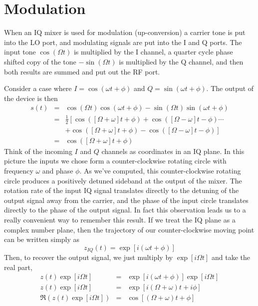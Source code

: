 \section{Modulation}

When an IQ mixer is used for modulation (up-conversion) a carrier tone is put into the LO port, and modulating signals are put into the I and Q ports. The input tone $\cos ( \Omega t)$ is multiplied by the I channel, a quarter cycle phase shifted copy of the tone $-\sin ( \Omega t)$ is multiplied by the Q channel, and then both results are summed and put out the RF port.

Consider a case where $I=\cos(\omega t + \phi)$ and $Q=\sin(\omega t + \phi)$. The output of the device is then \begin{eqnarray}
s(t) &=& \cos(\Omega t)\cos(\omega t + \phi) - \sin(\Omega t)\sin(\omega t + \phi) \nonumber \\
&=& \frac{1}{2} \left[ \cos([\Omega + \omega]t + \phi) + \cos([\Omega-\omega]t - \phi) \cdots \right. \nonumber \\ 
& & \left. + \cos([\Omega+\omega]t + \phi) - \cos([\Omega-\omega]t-\phi) \right] \label{eq:modulationRaw} \nonumber \\
&=& \cos([\Omega+\omega]t + \phi)
\end{eqnarray}
Think of the incoming $I$ and $Q$ channels as coordinates in an IQ plane. In this picture the inputs we chose form a counter-clockwise rotating circle with frequency $\omega$ and phase $\phi$. As we've computed, this counter-clockwise rotating circle produces a positively detuned sideband at the output of the mixer. The rotation rate of the input IQ signal translates directly to the detuning of the output signal away from the carrier, and the phase of the input circle translates directly to the phase of the output signal. In fact this observation leads us to a really convenient way to remember this result. If we treat the IQ plane as a complex number plane, then the trajectory of our counter-clockwise moving point can be written simply as \begin{equation}
z_{IQ}(t) = \exp[i(\omega t + \phi)] \label{eq:modulationComplexRep} \end{equation}
Then, to recover the output signal, we just multiply by $\exp[i\Omega t]$ and take the real part, \begin{eqnarray}
z(t)\exp[i\Omega t] &=& \exp[i(\omega t + \phi)]\exp[i\Omega t] \\
z(t)\exp[i\Omega t] &=& \exp[i(\Omega+\omega)t + i\phi] \\
\Re \left( z(t)\exp[i\Omega t] \right ) &=& \cos[(\Omega+\omega)t+\phi] \end{eqnarray}

